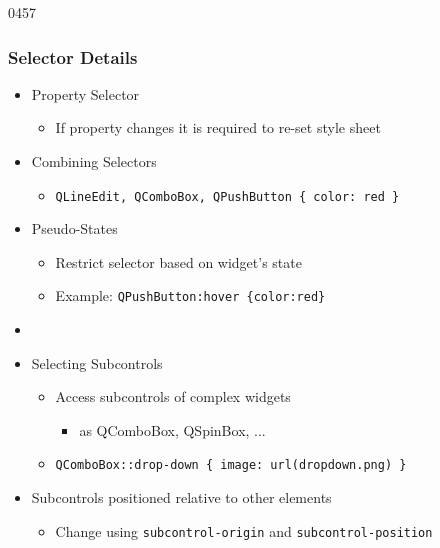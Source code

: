 \begin{slide}{0457}\frametitle{Selector Details}
\begin{itemize}
\item Property Selector
  \begin{itemize}
  \item If property changes it is required to re-set style sheet
  \end{itemize}
\item Combining Selectors
  \begin{itemize}
  \item \texttt{QLineEdit, QComboBox, QPushButton \{ color:\ red \}}
  \end{itemize}
\item Pseudo-States
  \begin{itemize}
  \item Restrict selector based on widget's state
  \item Example: \texttt{QPushButton:hover \{color:red\}}
  \end{itemize}
\item {}
\item Selecting Subcontrols
  \begin{itemize}
  \item Access subcontrols of complex widgets
    \begin{itemize}
    \item as QComboBox, QSpinBox, ...
    \end{itemize}
  \item \texttt{QComboBox::drop-down \{ image: url(dropdown.png) \}}
 \end{itemize}
  \item Subcontrols positioned relative to other elements
    \begin{itemize}
  \item Change using \texttt{subcontrol-origin} and \texttt{subcontrol-position}
  \end{itemize}

\end{itemize}
\end{slide}


